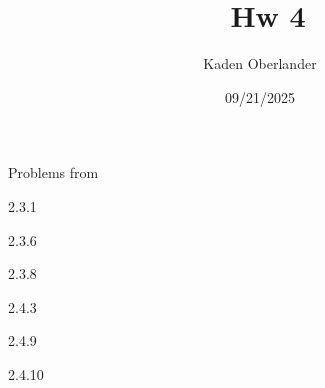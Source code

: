


\title{\textbf{\myclass{\ballocks}\ Hw 4}}
\author{Kaden Oberlander}
\date{09/21/2025}
\newcommand{\ballocks}{PDE}


	\hypersetup{bookmarksnumbered=true,}
	\maketitle
	Problems from \cite{\ballocks}
	
	
\setcounter{equation}{0}	
\begin{problem*}{2.3.1}{}

\end{problem*}

\setcounter{equation}{0}
\begin{problem*}{2.3.6}{}

\end{problem*}

\setcounter{equation}{0}
\begin{problem*}{2.3.8}{}

\end{problem*}

\setcounter{equation}{0}
\begin{problem*}{2.4.3}{}

\end{problem*}

\setcounter{equation}{0}
\begin{problem*}{2.4.9}{}
	
\end{problem*}

\setcounter{equation}{0}
\begin{problem*}{2.4.10}{}
	
\end{problem*}


 \vfill





